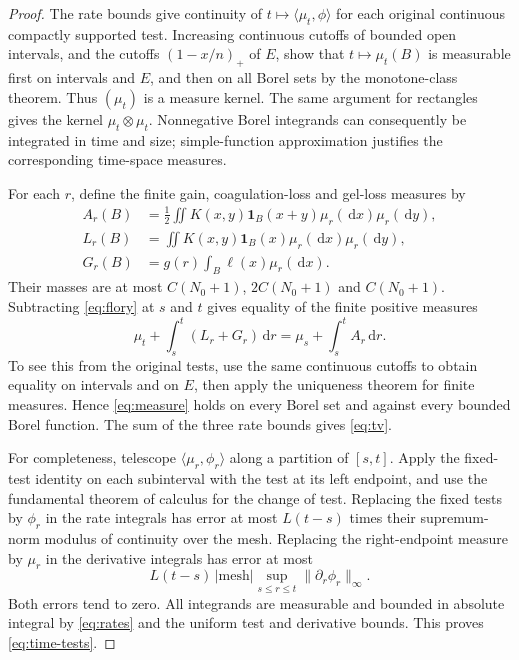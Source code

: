 \documentclass[11pt]{article}
\newcommand{\pair}[2]{\langle #1,#2\rangle}
\newcommand{\ind}{\mathbf{1}}
\newcommand{\dd}{\,\mathrm{d}}
\begin{document}
\begin{proof}
The rate bounds give continuity of $t\mapsto\pair{\mu_t}{\phi}$ for each original continuous compactly supported test. Increasing continuous cutoffs of bounded open intervals, and the cutoffs $(1-x/n)_+$ of $E$, show that $t\mapsto\mu_t(B)$ is measurable first on intervals and $E$, and then on all Borel sets by the monotone-class theorem. Thus $(\mu_t)$ is a measure kernel. The same argument for rectangles gives the kernel $\mu_t\otimes\mu_t$. Nonnegative Borel integrands can consequently be integrated in time and size; simple-function approximation justifies the corresponding time-space measures.

For each $r$, define the finite gain, coagulation-loss and gel-loss measures by
\[
 \begin{split}
 A_r(B)&=\frac12\iint K(x,y)\ind_B(x+y)\mu_r(\dd x)\mu_r(\dd y),\\
 L_r(B)&=\iint K(x,y)\ind_B(x)\mu_r(\dd x)\mu_r(\dd y),\\
 G_r(B)&=g(r)\int_B\ell(x)\mu_r(\dd x).
 \end{split}
\]
Their masses are at most $C(N_0+1)$, $2C(N_0+1)$ and $C(N_0+1)$. Subtracting \eqref{eq:flory} at $s$ and $t$ gives equality of the finite positive measures
\begin{equation}\label{eq:measure}
 \mu_t+\int_s^t(L_r+G_r)\dd r
 =\mu_s+\int_s^t A_r\dd r.
\end{equation}
To see this from the original tests, use the same continuous cutoffs to obtain equality on intervals and on $E$, then apply the uniqueness theorem for finite measures. Hence \eqref{eq:measure} holds on every Borel set and against every bounded Borel function. The sum of the three rate bounds gives \eqref{eq:tv}.

For completeness, telescope $\pair{\mu_r}{\phi_r}$ along a partition of $[s,t]$. Apply the fixed-test identity on each subinterval with the test at its left endpoint, and use the fundamental theorem of calculus for the change of test. Replacing the fixed tests by $\phi_r$ in the rate integrals has error at most $L(t-s)$ times their supremum-norm modulus of continuity over the mesh. Replacing the right-endpoint measure by $\mu_r$ in the derivative integrals has error at most
\[
 L(t-s)\,|\text{mesh}|\sup_{s\le r\le t}\|\partial_r\phi_r\|_\infty.
\]
Both errors tend to zero. All integrands are measurable and bounded in absolute integral by \eqref{eq:rates} and the uniform test and derivative bounds. This proves \eqref{eq:time-tests}.
\end{proof}
\end{document}
